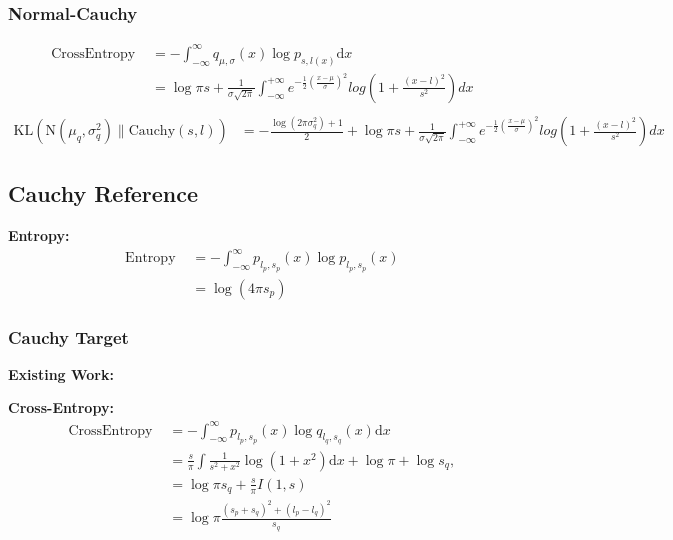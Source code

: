 \documentclass{article}
\begin{document}
\subsubsection{Normal-Cauchy}
$$ \begin{aligned}  \text { CrossEntropy }&=-\int_{-\infty}^{\infty} q_{\mu,\sigma}(x) \log p_{s,l(x)} \mathrm{d} x \\
&=\log{\pi s}+\frac{1}{\sigma\sqrt{2\pi}} \int_{-\infty}^{+\infty} e^{-\frac{1}{2}(\frac{x-\mu}{\sigma})^{2}}log(1+\frac{(x-l)^{2}}{s^{2}} )dx \\
\end{aligned}
$$
$$ \begin{aligned} \mathrm{KL}\left(\mathrm{N}\left(\mu_{q}, \sigma_{q}^{2}\right) \| \mathrm{Cauchy}\left(s, l\right)\right)&=-\frac{\log \left(2 \pi \sigma_{q}^{2}\right)+1}{2} +\log{\pi s}+\frac{1}{\sigma\sqrt{2\pi}} \int_{-\infty}^{+\infty} e^{-\frac{1}{2}(\frac{x-\mu}{\sigma})^{2}}log(1+\frac{(x-l)^{2}}{s^{2}} )dx
\end{aligned}
$$

\subsection{Cauchy Reference}

\noindent \textbf{Entropy:}
$$ \begin{aligned} \text { Entropy } &=-\int_{-\infty}^{\infty} p_{l_{p}, s_{p}}(x) \log p_{l_{p}, s_{p}}(x)\\
&=\log (4 \pi s_{p})\end{aligned} $$

\subsubsection{Cauchy Target}

\noindent \textbf{Existing Work:}

\noindent \textbf{Cross-Entropy:}
$$ \begin{aligned} \text { CrossEntropy }&=-\int_{-\infty}^{\infty} p_{l_{p}, s_{p}}(x) \log q_{l_{q}, s_{q}}(x) \mathrm{d} x\\& =\frac{s}{\pi} \int \frac{1}{s^{2}+x^{2}} \log \left(1+x^{2}\right) \mathrm{d} x+\log \pi+\log s_{q}, \\
&=\log \pi s_{q}+\frac{s}{\pi} I(1, s) \\
&=\log \pi \frac{\left(s_{p}+s_{q}\right)^{2}+\left(l_{p}-l_{q}\right)^{2}}{s_{q}}\\
\end{aligned} $$
\end{document}
